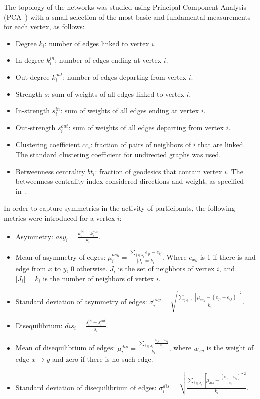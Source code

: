 \documentclass[%
 aip,
 jmp,%
 amsmath,amssymb,
 reprint,%
]{revtex4-1}
\begin{document}
The topology of the networks was studied using Principal Component Analysis (PCA~\cite{pca}) with a small selection of the most basic and fundamental measurements for each vertex, as follows:

\begin{itemize}
    \item Degree     $k_i$: number of edges linked to vertex $i$.
    \item In-degree  $k_i^{in}$: number of edges ending at vertex $i$.
    \item Out-degree $k_i^{out}$: number of edges departing from vertex $i$.
    \item Strength $s$: sum of weights of all edges linked to vertex $i$.
    \item In-strength $s_i^{in}$: sum of weights of all edges ending at vertex $i$.
    \item Out-strength $s_i^{out}$: sum of weights of all edges departing from vertex $i$.
    \item Clustering coefficient $cc_i$: fraction of pairs of neighbors of $i$ that are linked.  The standard clustering coefficient for undirected graphs was used.
    \item Betweenness centrality $bt_i$: fraction of geodesics that contain vertex $i$. The betweenness centrality index considered directions and weight, as specified in~\cite{faster}.
\end{itemize}

In order to capture symmetries in the activity of participants, the following metrics were introduced for a vertex $i$: 

\begin{itemize}
    \item Asymmetry: $asy_i=\frac{k_i^{in}-k_i^{out}}{k_i}$.
    \item Mean of asymmetry of edges: $\mu_i^{asy}=\frac{\sum_{j\in J_i} e_{ji}-e_{ij}}{|J_i|=k_i}$. Where $e_{xy}$ is 1 if there is and edge from $x$ to $y$, $0$ otherwise. $J_i$ is the set of neighbors of vertex $i$, and $|J_i|=k_i$ is the number of neighbors of vertex $i$.
    \item Standard deviation of asymmetry of edges: $\sigma_i^{asy}=\sqrt{\frac{\sum_{j\in J_i}[\mu_{asy} -(e_{ji}-e_{ij}) ]^2  }{k_i}  }$.
    \item Disequilibrium: $dis_i=\frac{s_i^{in}-s_i^{out}}{s_i}$.
    \item Mean of disequilibrium of edges: $\mu_i^{dis}=\frac{\sum_{j \in J_i}\frac{w_{ji}-w_{ij}}{s_i}}{k_i}$, where $w_{xy}$ is the weight of edge $x\rightarrow y$ and zero if there is no such edge.
    \item Standard deviation of disequilibrium of edges: $\sigma_i^{dis}=\sqrt{\frac{\sum_{j\in J_i}[\mu_{dis}-\frac{(w_{ji}-w_{ij})}{s_i}]^2}{k_i}}$.
\end{itemize}
\end{document}

